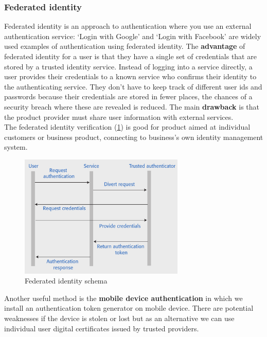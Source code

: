 \documentclass[10pt,a4paper]{report}
\begin{document}
\subsubsection{Federated identity}
Federated identity is an approach to authentication where you use an external authentication service: ‘Login with Google’ and ‘Login with Facebook’ are widely used examples of authentication using federated identity.
The \textbf{advantage} of federated identity for a user is that they have a single set of credentials that are stored by a trusted identity service. Instead of logging into a service directly, a user provides their credentials to a known service who confirms their identity to the authenticating service.
They don’t have to keep track of different user ids and passwords because their credentials are stored in fewer places, the chances of a security breach where these are revealed is reduced. The main \textbf{drawback} is that the product provider must share user information with external services.\\
The federated identity verification (\ref{image86}) is good for product aimed at individual customers or business product, connecting to business's own identity management system. 
\begin{figure}[h]
	\centering
	\includegraphics[width=0.7\textwidth]{image86}
	\caption{Federated identity schema}
	\label{image86}
\end{figure} 

Another useful method is the \textbf{mobile device authentication} in which we install an authentication token generator on mobile device. There are potential weaknesses if the device is stolen or lost but as an alternative we can use individual user digital certificates issued by trusted providers.
\end{document}
